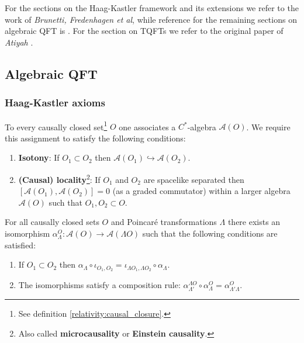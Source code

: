 \chapter{}

    For the sections on the Haag-Kastler framework and its extensions we refer to the work of \textit{Brunetti, Fredenhagen et al}, while reference for the remaining sections on algebraic QFT is \cite{baez_aqft}. For the section on TQFTs we refer to the original paper of \textit{Atiyah} \cite{atiyah}.

\section{Algebraic QFT}
\subsection{Haag-Kastler axioms}

    \begin{axiom}\label{qft:microcausality}
        To every causally closed set\footnote{See definition \ref{relativity:causal_closure}.} $O$ one associates a $C^*$-algebra $\mathcal{A}(O)$. We require this assignment to satisfy the following conditions:
        \begin{enumerate}
            \item \textbf{Isotony}: If $O_1\subset O_2$ then $\mathcal{A}(O_1)\hookrightarrow\mathcal{A}(O_2)$.
            \item \textbf{(Causal) locality}\footnote{Also called \textbf{microcausality} or \textbf{Einstein causality}.}: If $O_1$ and $O_2$ are spacelike separated then $[\mathcal{A}(O_1), \mathcal{A}(O_2)] = 0$ (as a graded commutator) within a larger algebra $\mathcal{A}(O)$ such that $O_1, O_2\subset O$.
        \end{enumerate}
    \end{axiom}

    \begin{axiom}
        For all causally closed sets $O$ and Poincar\'e transformations $\Lambda$ there exists an isomorphism $\alpha^O_\Lambda:\mathcal{A}(O)\rightarrow\mathcal{A}(\Lambda O)$ such that the following conditions are satisfied:
        \begin{enumerate}
            \item If $O_1\subset O_2$ then $\alpha_\Lambda\circ\iota_{O_1,O_2} = \iota_{\Lambda O_1, \Lambda O_2}\circ\alpha_\Lambda$.
            \item The isomorphisms satisfy a composition rule: $\alpha^{\Lambda O}_{\Lambda'}\circ\alpha^O_\Lambda = \alpha^O_{\Lambda'\Lambda}$.
        \end{enumerate}
    \end{axiom}

